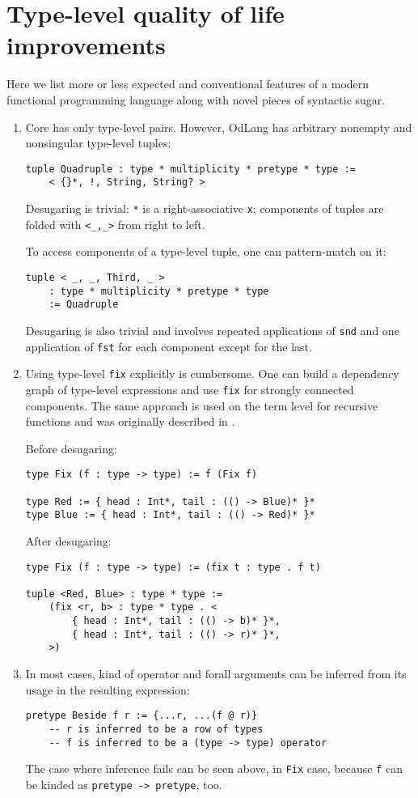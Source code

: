 \documentclass[a4paper,14pt]{extreport}
\begin{document}
\section{Type-level quality of life improvements}

Here we list more or less expected and conventional features of a modern
functional programming language along with novel pieces of syntactic sugar.

\begin{enumerate}
    \item Core has only type-level pairs. However, OdLang has arbitrary nonempty
        and nonsingular type-level tuples:
\begin{verbatim}
tuple Quadruple : type * multiplicity * pretype * type :=
    < {}*, !, String, String? >
\end{verbatim}
        Desugaring is trivial: \verb|*| is a right-associative \verb|x|;
        components of tuples are folded with \verb|<_,_>| from right to left.

        To access components of a type-level tuple, one can pattern-match on it:
\begin{verbatim}
tuple < _, _, Third, _ >
    : type * multiplicity * pretype * type
    := Quadruple
\end{verbatim}
        Desugaring is also trivial and involves repeated applications of
        \verb|snd| and one application of \verb|fst| for each component except
        for the last.
    \item Using type-level \verb|fix| explicitly is cumbersome. One can build a
        dependency graph of type-level expressions and use \verb|fix| for
        strongly connected components. The same approach is used on the term
        level for recursive functions and was originally described in
        \cite{spj}.

        Before desugaring:
\begin{verbatim}
type Fix (f : type -> type) := f (Fix f)

type Red := { head : Int*, tail : (() -> Blue)* }*
type Blue := { head : Int*, tail : (() -> Red)* }*
\end{verbatim}
        After desugaring:
\begin{verbatim}
type Fix (f : type -> type) := (fix t : type . f t)

tuple <Red, Blue> : type * type :=
    (fix <r, b> : type * type . <
        { head : Int*, tail : (() -> b)* }*,
        { head : Int*, tail : (() -> r)* }*,
    >)
\end{verbatim}
    \item In most cases, kind of operator and forall arguments can be inferred
        from its usage in the resulting expression:
\begin{verbatim}
pretype Beside f r := {...r, ...(f @ r)}
    -- r is inferred to be a row of types
    -- f is inferred to be a (type -> type) operator
\end{verbatim}
        The case where inference fails can be seen above, in \verb|Fix| case,
        because \verb|f| can be kinded as \verb|pretype -> pretype|, too.


\end{enumerate}
\end{document}
